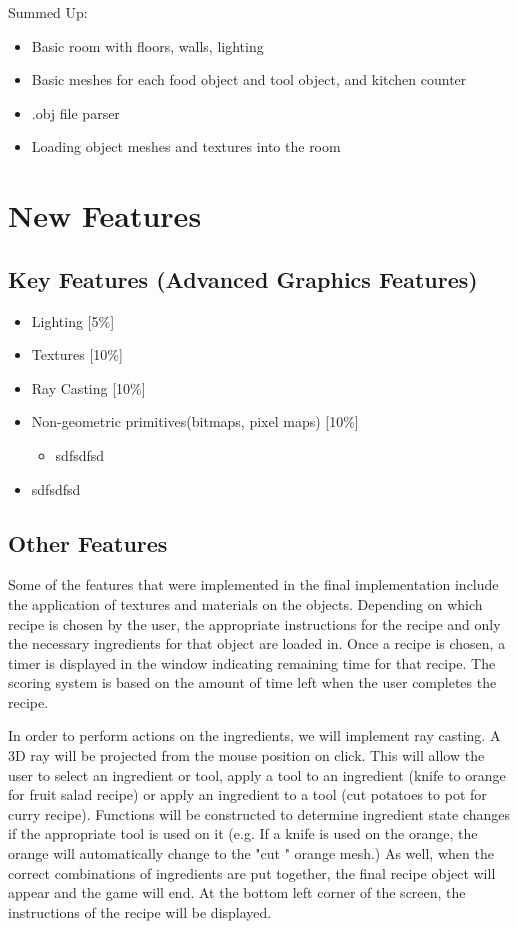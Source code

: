\documentclass[11pt]{article}
\begin{document}
Summed Up:
\begin{itemize}
\item Basic room with floors, walls, lighting
\item Basic meshes for each food object and tool object, and kitchen counter
\item .obj file parser
\item Loading object meshes and textures into the room
\end{itemize}

\section*{New Features}
\label{sec:org7c8059f}

\subsection*{Key Features (Advanced Graphics Features)}
\label{sec:org89eb218}
\begin{itemize}
\item Lighting [5\%]
\item Textures [10\%]
\item Ray Casting [10\%]
\item Non-geometric primitives(bitmaps, pixel maps) [10\%] 
\begin{itemize}
\item sdfsdfsd
\end{itemize}
\item sdfsdfsd
\end{itemize}

\subsection*{Other Features}
\label{sec:org128895f}
Some of the features that were implemented in the final implementation include the
 application of textures and materials on the objects. Depending on which recipe
is chosen by the user, the appropriate instructions for the recipe and only the 
necessary ingredients for that object are loaded in. Once a recipe is chosen, a 
timer is displayed in the window indicating remaining time for that recipe. The
scoring system is based on the amount of time left when the user completes the 
recipe.

 In order to perform
 actions on the ingredients, we will implement ray casting. A 3D ray will be
 projected from the mouse position on click. This will allow the user to
 select an ingredient or tool, apply a tool to an ingredient (knife to
 orange for fruit salad recipe) or apply an ingredient to a tool (cut potatoes
 to pot for curry recipe). Functions will be constructed to determine 
ingredient state changes if the appropriate tool is used on it (e.g. If a
 knife is used on the orange, the orange will automatically change to the "cut
" orange mesh.) As well, when the correct combinations of ingredients are put
 together, the final recipe object will appear and the game will end. At the
 bottom left corner of the screen, the instructions of the recipe will be displayed.
\end{document}
